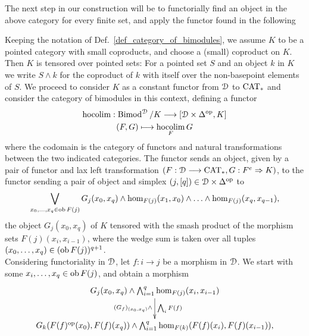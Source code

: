     The next step in our construction will be to functorially find an object in
    the above category for every finite set, and apply the functor found in the
    following
    \begin{defn}\label{def_hocolim}
      Keeping the notation of Def.~\ref{def_category_of_bimodules}, we assume
      $K$ to be a pointed category with small coproducts, and choose a (small)
      coproduct on $K$.  Then $K$ is tensored over pointed sets: For a pointed
      set $S$ and an object $k$ in $K$ we write $S \wedge k$ for the coproduct
      of $k$ with itself over the non-basepoint elements of $S$.
      We proceed to consider $K$ as a constant functor from $\mathcal{D}$ to $\mathrm{CAT}_*$
      and consider the category of bimodules in this context, defining a functor
      \begin{gather*}
        \hocolim: \operatorname{Bimod}^{\cD} / K \to %
          [\cD \times \Delta^{\mathrm{op}}, K]\\
        (F,G) \mapsto \hocolim_F G
      \end{gather*}
      where the codomain is the category of functors and natural transformations
      between the two indicated categories.
      The functor sends an object, given by a pair of functor and lax left
      transformation $(F: \mathcal{D} \longrightarrow \mathrm{CAT}_*, G: F^e \Rightarrow K)$, to the functor
      sending a pair of object and simplex $(j,[q]) \in \mathcal{D} \times
      \Delta^\mathrm{op}$ to
      \begin{displaymath}
        \bigvee_{x_0, \ldots, x_q \in \ob F(j)} %
          G_j(x_0,x_q) \wedge %
          \hom_{F(j)}(x_1,x_0) \wedge \ldots \wedge \hom_{F(j)}(x_q,x_{q-1}),
      \end{displaymath}
      the object $G_j(x_0,x_q)$ of $K$ tensored with the smash product of the
      morphism sets $F(j)(x_i,x_{i-1})$, where the wedge sum is taken over all
      tuples $(x_0, \ldots, x_q) \in (\operatorname{ob} F(j))^{q+1}$.\\
      Considering functoriality in $\mathcal{D}$, let $f: i \to j$ be a morphism in $\mathcal{D}$.
      We start with some $x_i, \ldots, x_q \in \operatorname{ob} F(j)$, and obtain a morphism
      \begin{displaymath}
        \xymatrix{
          G_j(x_0,x_q) \wedge \bigwedge_{i=1}^q \hom_{F(j)}(x_i,x_{i-1}) %
            \ar[d]_{(G_f)_{(x_0,x_q)} \wedge}^{\bigwedge_i F(f)}
          \\
          G_k(F(f)^{\mathrm{op}}(x_0),F(f)(x_q)) \wedge %
            \bigwedge_{i=1}^q \hom_{F(k)}(F(f)(x_i),F(f)(x_{i-1})),  
        }
      \end{displaymath}

\end{defn}
